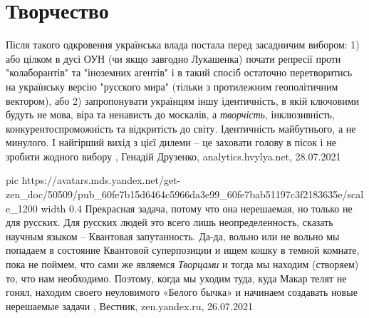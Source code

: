  
 
 
 
 
\chapter{Творчество}

Після такого одкровення українська влада постала перед засадничим вибором: 1)
або цілком в дусі ОУН (чи якщо завгодно Лукашенка) почати репресії проти
"колаборантів" та "іноземних агентів" і в такий спосіб остаточно перетворитись
на українську версію "русского мира" (тільки з протилежним геополітичним
вектором), або 2) запропонувати українцям іншу ідентичність, в якій ключовими
будуть не мова, віра та ненависть до москалів, а \emph{творчість},
інклюзивність, конкурентоспроможність та відкритість до світу. Ідентичність
майбутнього, а не минулого.  І найгірший вихід з цієї дилеми – це заховати
голову в пісок і не зробити жодного вибору
, 
Генадій Друзенко, analytics.hvylya.net, 28.07.2021

\ifcmt
  pic https://avatars.mds.yandex.net/get-zen_doc/50509/pub_60fe7b15d6464c5966da3e99_60fe7bab51197c3f2183635e/scale_1200
  width 0.4
\fi
Прекрасная задача, потому что она нерешаемая, но только не для русских. Для
русских людей это всего лишь неопределенность, сказать научным языком –
Квантовая запутанность. Да-да, вольно или не вольно мы попадаем в состояние
Квантовой суперпозиции и ищем кошку в темной комнате, пока не поймем, что сами
же являемся \emph{Творцами} и тогда мы находим (створяем) то, что нам необходимо.
Поэтому, когда мы уходим туда, куда Макар телят не гонял, находим своего
неуловимого «Белого бычка» и начинаем создавать новые нерешаемые задачи
, Вестник, zen.yandex.ru, 26.07.2021 
